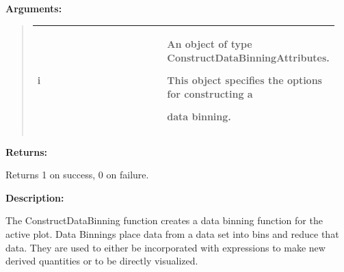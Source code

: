 \documentclass[letterpaper,10pt,english]{sphinxmanual}
\begin{document}
\begin{DUlineblock}{0em}
\item[] 
\item[] \textbf{Arguments:}
\end{DUlineblock}
\begin{quote}

\begin{tabular}{|p{0.475\linewidth}|p{0.475\linewidth}|}
\hline

i
 & 
\begin{DUlineblock}{0em}
\item[] An object of type ConstructDataBinningAttributes.
\item[] This object specifies the options for constructing a
\item[] data binning.
\end{DUlineblock}
\\
\hline\end{tabular}

\end{quote}

\begin{DUlineblock}{0em}
\item[] 
\item[] \textbf{Returns:}
\item[] Returns 1 on success, 0 on failure.
\item[] 
\item[] \textbf{Description:}
\item[] The ConstructDataBinning function creates a data binning function for the active
plot. Data Binnings place data from a data set into bins and reduce that data.
They are used to either be incorporated with expressions to make new derived quantities
or to be directly visualized.
\end{DUlineblock}

\begin{DUlineblock}{0em}
\item[] 
\end{DUlineblock}
\end{document}
